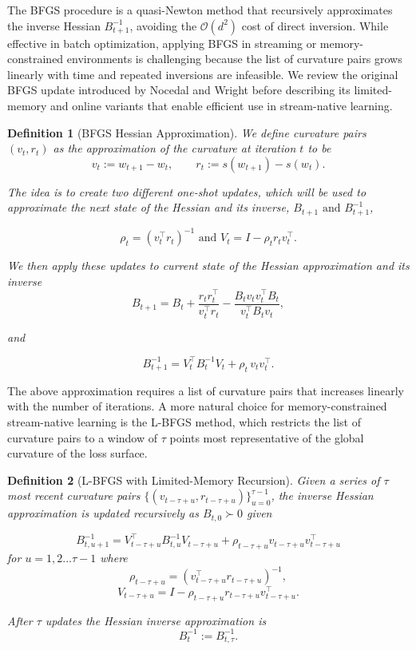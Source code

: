\documentclass{article}
\theoremstyle{ssltheorem}
\newtheorem{definition}{Definition}
\begin{document}
The BFGS procedure is a quasi-Newton method that recursively approximates the inverse Hessian 
$B_{t+1}^{-1}$, avoiding the $\mathcal{O}(d^{2})$ cost of direct inversion.
While effective in batch optimization, applying BFGS in streaming or memory-constrained environments is challenging because the list of curvature pairs grows linearly with time and repeated inversions are infeasible.
We review the original BFGS update introduced by Nocedal and Wright \cite{Liu_Nocedal_1989,mokhtari2015online} before describing its limited-memory and online variants that enable efficient use in stream-native learning.
\begin{definition}[BFGS Hessian Approximation]

We define curvature pairs $(v_{t}, r_{t})$ as the approximation of the curvature at iteration $t$ to be
$$
v_{t} := w_{t+1}-w_{t},\qquad
r_{t} := s(w_{t+1})-s(w_{t}).
$$

The idea is to create two different one-shot updates, which will be used to approximate the next state of the Hessian and its inverse, $B_{t+1}\text{ and }B_{t+1}^{-1}$,

$$
\rho_{t} = (v_{t}^{\top}r_{t})^{-1} \text{ and } V_{t} = I - \rho_{t}r_{t}v_{t}^{\top}.
$$

We then apply these updates to current state of the Hessian approximation and its inverse
$$
B_{t+1} = B_{t} + \frac{r_{t} r_{t}^\top}{v_{t}^\top r_{t}} - \frac{B_{t} v_{t} v_{t}^\top B_{t}}{v_{t}^\top B_{t} v_{t}},
$$

and 

$$
B_{t+1}^{-1} = V_{t}^{\top} B_{t}^{-1} V_{t} + \rho_{t}\, v_{t} v_{t}^{\top}.
$$
\end{definition}

The above approximation requires a list of curvature pairs that increases linearly with the number of iterations.
A more natural choice for memory-constrained stream-native learning is the L-BFGS method, which restricts the list of curvature pairs to a window of $\tau$ points most representative of the global curvature of the loss surface.
\begin{definition}[L-BFGS with Limited-Memory Recursion]

Given a series of $\tau$ most recent curvature pairs 
$\{(v_{t-\tau+u}, r_{t-\tau+u})\}_{u=0}^{\tau-1}$, 
the inverse Hessian approximation is updated recursively as $B_{t, 0} \succ 0$ given

$$
B_{t, u+1}^{-1} = V^{\top}_{t-\tau+u}B_{t,u}^{-1}V_{t-\tau+u} + \rho_{t-\tau+u}v_{t-\tau+u}v_{t-\tau+u}^{\top}
$$
for $u = 1, 2...\tau-1$ where
$$
\rho_{t-\tau+u} = (v_{t-\tau+u}^{\top} r_{t-\tau+u})^{-1},
$$
$$
V_{t-\tau+u} = I - \rho_{t-\tau+u} r_{t-\tau+u} v_{t-\tau+u}^{\top}.
$$

After $\tau$ updates the Hessian inverse approximation is
$$
B^{-1}_{t} := B^{-1}_{t,\tau}.
$$
\end{definition}
\end{document}
